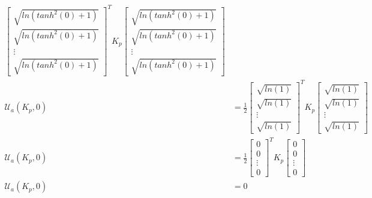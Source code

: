 \documentclass[12pt]{article}
\begin{document}
\begin{enumerate}
\begin{itemize}
\begin{equation}
\begin{split}
            \begin{bmatrix}
                \sqrt{ln(tanh^2(0)+1)}\\
                \sqrt{ln(tanh^2(0)+1)}\\
                \vdots\\
                \sqrt{ln(tanh^2(0)+1)}
            \end{bmatrix}^T
            K_p
            \begin{bmatrix}
                \sqrt{ln(tanh^2(0)+1)}\\
                \sqrt{ln(tanh^2(0)+1)}\\
                \vdots\\
                \sqrt{ln(tanh^2(0)+1)}
            \end{bmatrix}\\
            \mathcal{U}_a(K_p,0)&=
                \frac{1}{2}
            \begin{bmatrix}
                \sqrt{ln(1)}\\
                \sqrt{ln(1)}\\
                \vdots\\
                \sqrt{ln(1)}
            \end{bmatrix}^T
            K_p
            \begin{bmatrix}
                \sqrt{ln(1)}\\
                \sqrt{ln(1)}\\
                \vdots\\
                \sqrt{ln(1)}
            \end{bmatrix}\\
            \mathcal{U}_a(K_p,0)&=
                \frac{1}{2}
            \begin{bmatrix}
                0\\
                0\\
                \vdots\\
                0
            \end{bmatrix}^T
            K_p
            \begin{bmatrix}
                0\\
                0\\
                \vdots\\
                0
            \end{bmatrix}\\
            \mathcal{U}_a(K_p,0)&=0
            \end{split}

\end{equation}
\end{itemize}
\end{enumerate}
\end{document}
